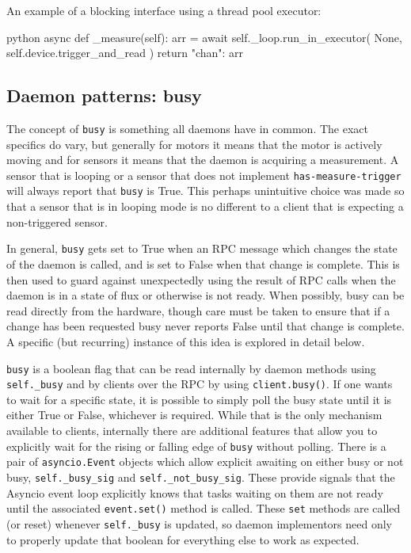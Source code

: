 An example of a blocking interface using a thread pool executor:

\begin{codefragment}{python}
    async def _measure(self):
        arr = await self._loop.run_in_executor(
            None,
            self.device.trigger_and_read
        )
        return {"chan": arr}
\end{codefragment}

\subsection{Daemon patterns: busy}

The concept of \texttt{busy} is something all \yaq{} daemons have in common.
The exact specifics do vary, but generally for motors it means that the motor is actively moving and for sensors it means that the daemon is acquiring a measurement.
A sensor that is looping or a sensor that does not implement \texttt{has-measure-trigger} will always report that \texttt{busy} is True.
This perhaps unintuitive choice was made so that a sensor that is in looping mode is no different to a client that is expecting a non-triggered sensor.

In general, \texttt{busy} gets set to True when an RPC message which changes the state of the daemon is called, and is set to False when that change is complete.
This is then used to guard against unexpectedly using the result of RPC calls when the daemon is in a state of flux or otherwise is not ready.
When possibly, busy can be read directly from the hardware, though care must be taken to ensure that if a change has been requested busy never reports False until that change is complete.
A specific (but recurring) instance of this idea is explored in detail below.

\texttt{busy} is a boolean flag that can be read internally by daemon methods using \texttt{self.\_busy} and by clients over the RPC by using \texttt{client.busy()}.
If one wants to wait for a specific state, it is possible to simply poll the busy state until it is either True or False, whichever is required.
While that is the only mechanism available to clients, internally there are additional features that allow you to explicitly wait for the rising or falling edge of \texttt{busy} without polling.
There is a pair of \texttt{asyncio.Event} objects\cite{asyncioevent} which allow explicit awaiting on either busy or not busy, \texttt{self.\_busy\_sig} and \texttt{self.\_not\_busy\_sig}.
These provide signals that the Asyncio event loop explicitly knows that tasks waiting on them are not ready until the associated \texttt{event.set()} method is called.
These \texttt{set} methods are called (or reset) whenever \texttt{self.\_busy} is updated, so daemon implementors need only to properly update that boolean for everything else to work as expected.

